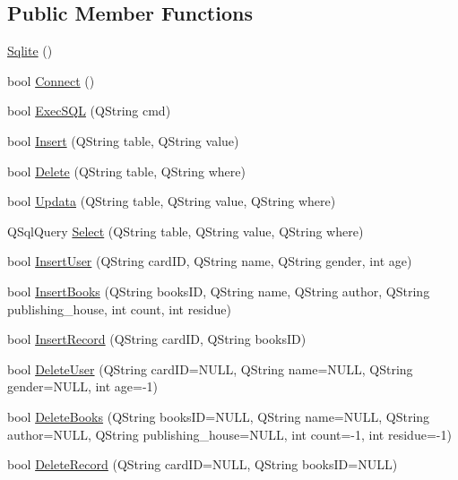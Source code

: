 \subsection*{Public Member Functions}
\begin{DoxyCompactItemize}
\item 
\mbox{\hyperlink{class_sqlite_a8aef4e64531e1522f892c0c6ec69cdff}{Sqlite}} ()
\item 
bool \mbox{\hyperlink{class_sqlite_aa93509c1e19a7d486f4f38ff4bc78a89}{Connect}} ()
\item 
bool \mbox{\hyperlink{class_sqlite_a3d4be952cdb19b674a80dacd78e2873a}{Exec\+S\+QL}} (Q\+String cmd)
\item 
bool \mbox{\hyperlink{class_sqlite_a8d0c32df6db2b0ca13695cfa8780840e}{Insert}} (Q\+String table, Q\+String value)
\item 
bool \mbox{\hyperlink{class_sqlite_a772711beeceff7a567192e19abccfed4}{Delete}} (Q\+String table, Q\+String where)
\item 
bool \mbox{\hyperlink{class_sqlite_ae014031d1e0b0d9c412fb72ddc5a0043}{Updata}} (Q\+String table, Q\+String value, Q\+String where)
\item 
Q\+Sql\+Query \mbox{\hyperlink{class_sqlite_a9a39cca147a504c82e98261707aa1e8d}{Select}} (Q\+String table, Q\+String value, Q\+String where)
\item 
bool \mbox{\hyperlink{class_sqlite_a950aea188ad2f7285032756cfe0ecc6d}{Insert\+User}} (Q\+String card\+ID, Q\+String name, Q\+String gender, int age)
\item 
bool \mbox{\hyperlink{class_sqlite_a246c39ac5e6db51d8bf2fa60e2740d37}{Insert\+Books}} (Q\+String books\+ID, Q\+String name, Q\+String author, Q\+String publishing\+\_\+house, int count, int residue)
\item 
bool \mbox{\hyperlink{class_sqlite_a278f03d5b8e7f6dba8e97d3d5310c4b5}{Insert\+Record}} (Q\+String card\+ID, Q\+String books\+ID)
\item 
bool \mbox{\hyperlink{class_sqlite_af2b581d800d01e1f1281d98ec1341ddd}{Delete\+User}} (Q\+String card\+ID=N\+U\+LL, Q\+String name=N\+U\+LL, Q\+String gender=N\+U\+LL, int age=-\/1)
\item 
bool \mbox{\hyperlink{class_sqlite_a8a83c22e036086edf84758fb0f6cfc56}{Delete\+Books}} (Q\+String books\+ID=N\+U\+LL, Q\+String name=N\+U\+LL, Q\+String author=N\+U\+LL, Q\+String publishing\+\_\+house=N\+U\+LL, int count=-\/1, int residue=-\/1)
\item 
bool \mbox{\hyperlink{class_sqlite_aa120de86db20f42a61a5c2eae9ad6b89}{Delete\+Record}} (Q\+String card\+ID=N\+U\+LL, Q\+String books\+ID=N\+U\+LL)

\end{DoxyCompactItemize}
